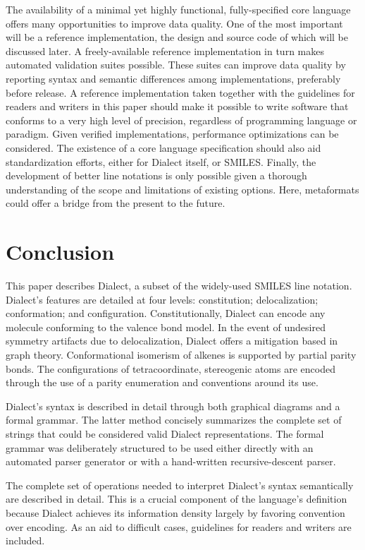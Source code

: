 \documentclass{article}
\begin{document}
The availability of a minimal yet highly functional, fully-specified core language offers many opportunities to improve data quality. One of the most important will be a reference implementation, the design and source code of which will be discussed later. A freely-available reference implementation in turn makes automated validation suites possible. These suites can improve data quality by reporting syntax and semantic differences among implementations, preferably before release. A reference implementation taken together with the guidelines for readers and writers in this paper should make it possible to write software that conforms to a very high level of precision, regardless of programming language or paradigm. Given verified implementations, performance optimizations can be considered. The existence of a core language specification should also aid standardization efforts, either for Dialect itself, or SMILES. Finally, the development of better line notations is only possible given a thorough understanding of the scope and limitations of existing options. Here, metaformats could offer a bridge from the present to the future.

\section*{Conclusion}

This paper describes Dialect, a subset of the widely-\-used SMILES line notation. Dialect's features are detailed at four levels: constitution; delocalization; conformation; and configuration. Constitutionally, Dialect can encode any molecule conforming to the valence bond model. In the event of undesired symmetry artifacts due to delocalization, Dialect offers a mitigation based in graph theory. Conformational isomerism of alkenes is supported by partial parity bonds. The configurations of tetracoordinate, stereogenic atoms are encoded through the use of a parity enumeration and conventions around its use.

Dialect's syntax is described in detail through both graphical diagrams and a formal grammar. The latter method concisely summarizes the complete set of strings that could be considered valid Dialect representations. The formal grammar was deliberately structured to be used either directly with an automated parser generator or with a hand-written recursive-descent parser.

The complete set of operations needed to interpret Dialect's syntax semantically are described in detail. This is a crucial component of the language's definition because Dialect achieves its information density largely by favoring convention over encoding. As an aid to difficult cases, guidelines for readers and writers are included.
\end{document}
